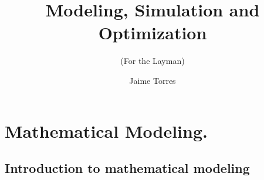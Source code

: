 \documentclass{textbook}
\title     {Modeling, Simulation and Optimization}
\subtitle  {(For the Layman)}
\author    {Jaime Torres}
\begin{document}
\tableofcontents

\chapter{Mathematical Modeling.}
\section{Introduction to mathematical modeling}
\end{document}
